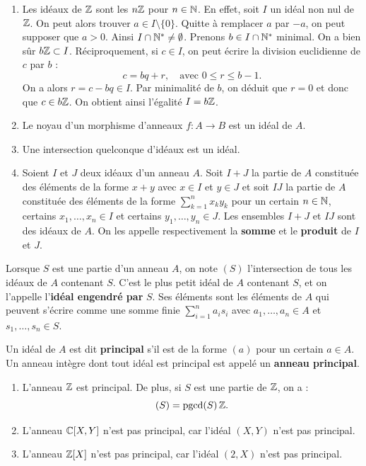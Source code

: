 \documentclass[]{report}
\begin{document}
\begin{ex}{}{}
    \begin{enumerate}
        \item Les idéaux de $\mathbb{Z}$ sont les $n\mathbb{Z}$ pour $n \in \mathbb{N}$. En effet, soit $I$ un idéal non nul de $\mathbb{Z}$. On peut alors trouver $a \in I \setminus \{0\}$. Quitte à remplacer $a$ par $-a$, on peut supposer que $a > 0$. Ainsi $I \cap \mathbb{N}^* \neq \emptyset$. Prenons $b \in I \cap \mathbb{N}^*$ minimal. On a bien sûr $b\mathbb{Z} \subset I$. Réciproquement, si $c \in I$, on peut écrire la division euclidienne de $c$ par $b$ :
        \[c = bq + r, \quad \text{avec } 0 \le r \le b - 1.\]
        On a alors $r = c - bq \in I$. Par minimalité de $b$, on déduit que $r = 0$ et donc que $c \in b\mathbb{Z}$. On obtient ainsi l'égalité $I = b\mathbb{Z}$.
        \item Le noyau d'un morphisme d'anneaux $f : A \rightarrow B$ est un idéal de $A$.
        \item Une intersection quelconque d'idéaux est un idéal.
        \item Soient $I$ et $J$ deux idéaux d'un anneau $A$. Soit $I + J$ la partie de $A$ constituée des éléments de la forme $x + y$ avec $x \in I$ et $y \in J$ et soit $IJ$ la partie de $A$ constituée des éléments de la forme $\sum_{k=1}^n x_k y_k$ pour un certain $n \in \mathbb{N}$, certains $x_1, \dots, x_n \in I$ et certains $y_1, \dots, y_n \in J$. Les ensembles $I + J$ et $IJ$ sont des idéaux de $A$. On les appelle respectivement la \textbf{somme} et le \textbf{produit} de $I$ et $J$.
    \end{enumerate}
\end{ex}

Lorsque $S$ est une partie d'un anneau $A$, on note $(S)$ l'intersection de tous les idéaux de $A$ contenant $S$. C'est le plus petit idéal de $A$ contenant $S$, et on l'appelle l'\textbf{idéal engendré par} $S$. Ses éléments sont les éléments de $A$ qui peuvent s'écrire comme une somme finie $\sum_{i=1}^n a_i s_i$ avec $a_1, \dots, a_n \in A$ et $s_1, \dots, s_n \in S$.

Un idéal de $A$ est dit \textbf{principal} s'il est de la forme $(a)$ pour un certain $a \in A$. Un anneau intègre dont tout idéal est principal est appelé un \textbf{anneau principal}.

\begin{ex}{}{}
    \begin{enumerate}
        \item L'anneau $\mathbb{Z}$ est principal. De plus, si $S$ est une partie de $\mathbb{Z}$, on a :
        \[(S) = \text{pgcd}(S) \, \mathbb{Z}.\]
        \item L'anneau $\mathbb{C}[X, Y]$ n'est pas principal, car l'idéal $(X, Y)$ n'est pas principal.
        \item L'anneau $\mathbb{Z}[X]$ n'est pas principal, car l'idéal $(2, X)$ n'est pas principal.
    \end{enumerate}
\end{ex}
\end{document}
